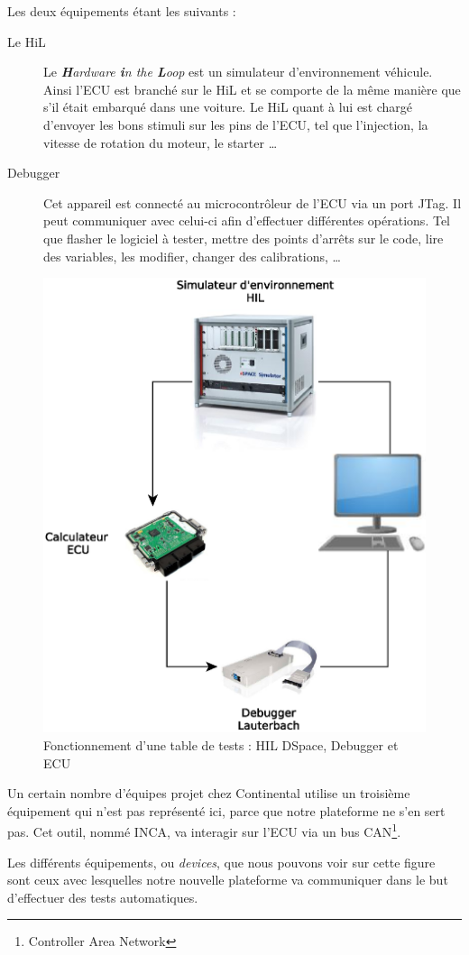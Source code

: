 		Les deux équipements étant les suivants : 
		\begin{description}
			\item[Le HiL] Le \textit{\textbf{H}ardware \textbf{i}n the \textbf{L}oop} est un simulateur d'environnement véhicule. Ainsi l'ECU est branché sur le HiL et se comporte de la même manière que s'il était embarqué dans une voiture. Le HiL quant à lui est chargé d'envoyer les bons stimuli sur les pins de l'ECU, tel que l'injection, la vitesse de rotation du moteur, le starter \ldots
			\item[Debugger] Cet {appareil} est connecté au microcontrôleur de l'ECU via un port JTag. Il peut communiquer avec celui-ci afin d'effectuer différentes opérations. Tel que flasher le logiciel à tester, mettre des points d'arrêts sur le code, lire des variables, les modifier, changer des calibrations, \ldots
		\end{description}
	
		\begin{figure}[H]
			\centering
			\includegraphics[width=12.1cm]{contents/images/WB.eps}
			\caption{Fonctionnement d'une table de tests : HIL DSpace, Debugger et ECU}
			\label{fig:wb}
		\end{figure}
				\begin{remarque}
					Un certain nombre d'équipes projet chez Continental utilise un troisième équipement qui n'est pas représenté ici, parce que notre plateforme ne s'en sert pas. Cet outil, nommé INCA, va interagir sur l'ECU via un bus CAN\footnote{Controller Area Network}.
				\end{remarque}
		Les différents équipements, ou \textit{devices}, que nous pouvons voir sur cette figure sont ceux avec lesquelles notre nouvelle plateforme va communiquer dans le but d'effectuer des tests automatiques. 
		
